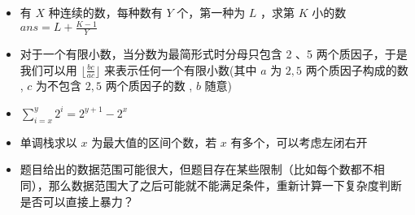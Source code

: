 \documentclass[E:/GsjzTle/main/main.tex]{subfiles}
\begin{document}
\begin{itemize}
\item
  有 \(X\) 种连续的数，每种数有 \(Y\) 个，第一种为 \(L\) ，求第 \(K\)
  小的数\\
  \(ans = L + \frac{K-1} Y\)
\item
  对于一个有限小数，当分数为最简形式时分母只包含 2 、5
  两个质因子，于是我们可以用 \(\lfloor\frac{bc}{ac}\rfloor\)
  来表示任何一个有限小数(其中 \(a\) 为 \(2,5\) 两个质因子构成的数 ,
  \(c\) 为不包含 \(2,5\) 两个质因子的数 , \(b\) 随意)
\item
  \(\sum_{i=x}^y2^i=2^{y+1}-2^{x}\)
\item
  单调栈求以 \(x\) 为最大值的区间个数，若 \(x\) 有多个，可以考虑左闭右开
\item
  题目给出的数据范围可能很大，但题目存在某些限制（比如每个数都不相同），那么数据范围大了之后可能就不能满足条件，重新计算一下复杂度判断是否可以直接上暴力？
\end{itemize}
\end{document}
